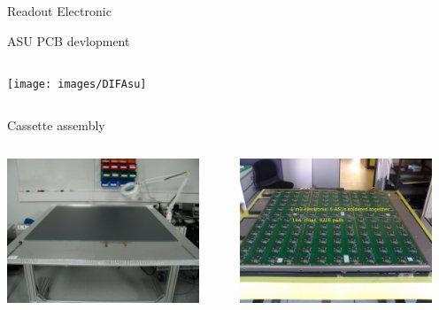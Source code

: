 \documentclass[10pt]{beamer}
\begin{document}
\begin{frame}[shrink=3]{Readout Electronic}
\begin{block}{ASU PCB devlopment}
\begin{columns}
      \begin{column}{0.5\textwidth}
         \centerline{\texttt{[image: images/DIFAsu]}}
      \end{column}

    \end{columns}
\end{block}
\end{frame}
\begin{frame}{Cassette assembly}
\begin{columns}
      \begin{column}{0.5\textwidth}

        \centerline{\includegraphics[width=0.9\textwidth]{images/ConstructionRPC}}
      \end{column}
\pause
      \begin{column}{0.5\textwidth}


        \centerline{\includegraphics[width=0.9\textwidth]{images/1m2HR2}}
      \end{column}
    \end{columns}
\begin{columns}
\pause


\end{columns}
\end{frame}
\end{document}
